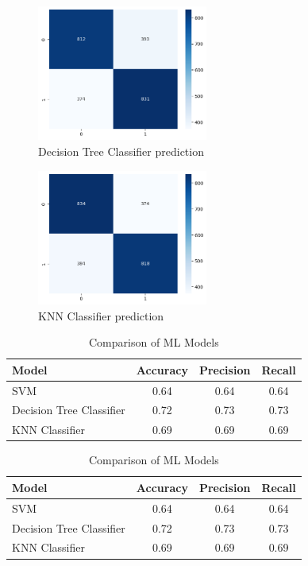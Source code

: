 \documentclass[conference]{IEEEtran}
\begin{document}
\begin{figure}
\includegraphics[width=0.5\textwidth]{img/dec_pred.png}
\caption{Decision Tree Classifier prediction}
\label{fig}
\end{figure}

\begin{figure}
\includegraphics[width=0.5\textwidth]{img/knn_pred.png}
\caption{KNN Classifier prediction}
\label{fig}
\end{figure}

\begin{table}[htbp]
    \centering
    \caption{Comparison of ML Models}
    \label{tab:ml_comparison}
    \begin{tabular}{lccc}
        \hline
        \textbf{Model} & \textbf{Accuracy} & \textbf{Precision} & \textbf{Recall} \\
        \hline
        SVM & 0.64 & 0.64 & 0.64 \\
        Decision Tree Classifier & 0.72 & 0.73 & 0.73 \\
        KNN Classifier & 0.69 & 0.69 & 0.69 \\
        \hline
    \end{tabular}
\end{table}

\begin{table}[htbp]
    \centering
    \caption{Comparison of ML Models}
    \label{tab:ml_comparison}
    \begin{tabular}{lccc}
        \hline
        \textbf{Model} & \textbf{Accuracy} & \textbf{Precision} & \textbf{Recall} \\
        \hline
        SVM & 0.64 & 0.64 & 0.64 \\
        Decision Tree Classifier & 0.72 & 0.73 & 0.73 \\
        KNN Classifier & 0.69 & 0.69 & 0.69 \\
        \hline
    \end{tabular}
\end{table}
\end{document}

